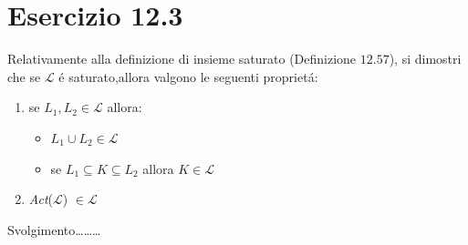 	\section{Esercizio 12.3}
		\qquad Relativamente alla definizione di insieme saturato (Definizione
		$12.57$), si dimostri che se $\mathcal{L}$ \'e saturato,allora valgono le
		seguenti propriet\'a:
		\begin{enumerate}
		  \item se $L_1,L_2 \in \mathcal{L}$ allora:
		  \begin{itemize}
		    \item $L_1 \cup L_2 \in \mathcal{L}$
		    \item se $L_1 \subseteq K \subseteq L_2$ allora $K \in \mathcal{L}$
		  \end{itemize}
		  \item \emph{Act}($\mathcal{L}$) $\in \mathcal{L}$
		\end{enumerate}
		
		\sectionline
		
		\qquad Svolgimento\ldots\ldots\ldots